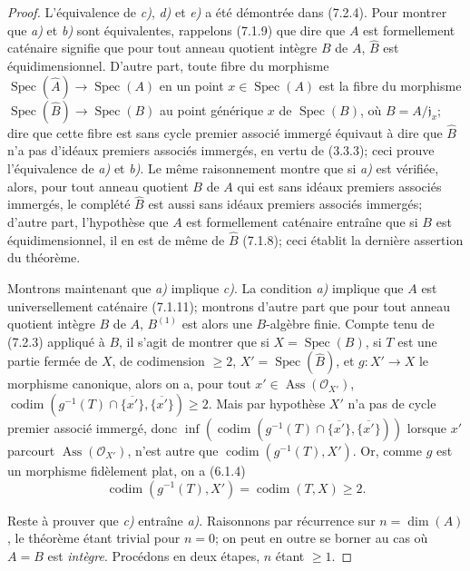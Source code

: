 \begin{proof}
L'équivalence de \emph{c)}, \emph{d)} et \emph{e)} a été démontrée dans (7.2.4). Pour montrer
que \emph{a)} et \emph{b)} sont équivalentes, rappelons (7.1.9) que dire que $A$ est
formellement caténaire signifie que pour tout anneau quotient intègre $B$
de $A$, $\widehat B$ est équidimensionnel. D'autre part, toute fibre du
morphisme $\operatorname{Spec}(\widehat A)\to\operatorname{Spec}(A)$ en un
point $x\in\operatorname{Spec}(A)$ est la fibre du morphisme
$\operatorname{Spec}(\widehat B)\to\operatorname{Spec}(B)$ au point
générique $x$ de $\operatorname{Spec}(B)$, où
$B=A/\mathfrak j_x$; dire que cette fibre est sans cycle premier associé
immergé équivaut à dire que $\widehat B$ n'a pas d'idéaux premiers associés
immergés, en vertu de (3.3.3); ceci prouve l'équivalence de \emph{a)} et \emph{b)}. Le
même raisonnement montre que si \emph{a)} est vérifiée, alors, pour tout anneau
quotient $B$ de $A$ qui est sans idéaux premiers associés immergés, le
complété $\widehat B$ est aussi sans idéaux premiers associés immergés;
d'autre part, l'hypothèse que $A$ est formellement caténaire entraîne que
si $B$ est équidimensionnel, il en est de même de $\widehat B$ (7.1.8);
ceci établit la dernière assertion du théorème.

Montrons maintenant que \emph{a)} implique \emph{c)}. La condition \emph{a)} implique que $A$
est universellement caténaire (7.1.11); montrons d'autre part que pour tout
anneau quotient intègre $B$ de $A$, $B^{(1)}$ est alors une $B$-algèbre
finie. Compte tenu de (7.2.3) appliqué à $B$, il s'agit de montrer que si
$X=\operatorname{Spec}(B)$, si $T$ est une partie fermée de $X$, de
codimension $\geqslant2$, $X'=\operatorname{Spec}(\widehat B)$, et
$g:X'\to X$ le morphisme canonique, alors on a, pour tout
$x'\in\operatorname{Ass}(\mathscr O_{X'})$,
$\operatorname{codim}(g^{-1}(T)\cap\overline{\{x'\}},
\overline{\{x'\}})\geqslant2$.
Mais par hypothèse $X'$ n'a pas de cycle premier associé immergé, donc
$\inf(\operatorname{codim}(g^{-1}(T)\cap\overline{\{x'\}},
\overline{\{x'\}}))$ lorsque $x'$ parcourt
$\operatorname{Ass}(\mathscr O_{X'})$, n'est autre que
$\operatorname{codim}(g^{-1}(T),X')$.
Or, comme $g$ est un morphisme fidèlement plat, on a (6.1.4)
\[
\operatorname{codim}(g^{-1}(T),X')=\operatorname{codim}(T,X)\geqslant2.
\]


Reste à prouver que \emph{c)} entraîne \emph{a)}. Raisonnons par récurrence sur
$n=\dim(A)$, le théorème étant trivial pour $n=0$; on peut en outre se
borner au cas où $A=B$ est \emph{intègre}. Procédons en deux étapes, $n$ étant
$\geqslant1$.


\end{proof}

